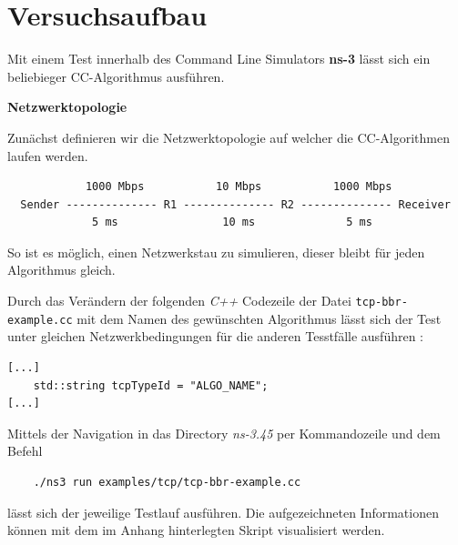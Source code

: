 \documentclass[paper=a4,fontsize=12pt,ngerman]{scrartcl}
\begin{document}
\clearpage
\section{Versuchsaufbau}

Mit einem Test innerhalb des Command Line Simulators \textbf{ns-3}\cite{ns3-simu} lässt sich ein beliebieger CC-Algorithmus ausführen.


\textbf{Netzwerktopologie}

Zunächst definieren wir die Netzwerktopologie auf welcher die CC-Algorithmen
laufen werden.\cite{ns3BBR}
\small
\begin{verbatim}
            1000 Mbps           10 Mbps           1000 Mbps
  Sender -------------- R1 -------------- R2 -------------- Receiver
             5 ms                10 ms              5 ms
\end{verbatim}
So ist es möglich, einen Netzwerkstau zu simulieren, dieser bleibt für jeden Algorithmus gleich.

Durch das Verändern der folgenden \textit{C++} Codezeile der Datei \verb|tcp-bbr-example.cc| mit dem Namen des gewünschten Algorithmus lässt sich der Test unter gleichen Netzwerkbedingungen für die anderen Tesstfälle ausführen :

\small
\begin{verbatim}
[...]
    std::string tcpTypeId = "ALGO_NAME";     
[...]
\end{verbatim}
Mittels der Navigation in das Directory \textit{ns-3.45} per Kommandozeile und dem Befehl
\small
\begin{verbatim}
    ./ns3 run examples/tcp/tcp-bbr-example.cc
\end{verbatim}
lässt sich der jeweilige Testlauf ausführen.
 Die aufgezeichneten Informationen können mit dem im Anhang hinterlegten Skript visualisiert werden.
\end{document}
